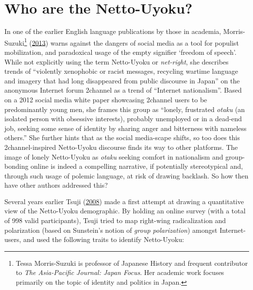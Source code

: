 \documentclass[10pt,british,A4paper,oneside]{memoir}
\begin{document}
\section{Who are the Netto-Uyoku?}\label{who-are-the-netto-uyoku}

In one of the earlier English language publications by those in
academia, Morris-Suzuki\footnote{Tessa Morris-Suzuki is professor of
  Japanese History and frequent contributor to \emph{The Asia-Pacific
  Journal: Japan Focus}. Her academic work focuses primarily on the
  topic of identity and politics in Japan.}
(\protect\hyperlink{ref-morris-suzuki_freedom_2013}{2013}) warns against
the dangers of social media as a tool for populist mobilization, and
paradoxical usage of the empty signifier `freedom of speech'. While not
explicitly using the term Netto-Uyoku or \emph{net-right}, she describes
trends of ``violently xenophobic or racist messages, recycling wartime
language and imagery that had long disappeared from public discourse in
Japan'' on the anonymous Internet forum 2channel as a trend of
``Internet nationalism''. Based on a 2012 social media white paper
showcasing 2channel users to be predominantly young men, she frames this
group as ``lonely, frustrated \emph{otaku} (an isolated person with
obsessive interests), probably unemployed or in a dead-end job, seeking
some sense of identity by sharing anger and bitterness with nameless
others.'' She further hints that as the social media-scape shifts, so
too does this 2channel-inspired Netto-Uyoku discourse finds its way to
other platforms. The image of lonely Netto-Uyoku as \emph{otaku} seeking
comfort in nationalism and group-bonding online is indeed a compelling
narrative, if potentially stereotypical and, through such usage of
polemic language, at risk of drawing backlash. So how then have other
authors addressed this?

Several years earlier Tsuji
(\protect\hyperlink{ref-tsuji_eng:_2008}{2008}) made a first attempt at
drawing a quantitative view of the Netto-Uyoku demographic. By holding
an online survey (with a total of 998 valid participants), Tsuji tried
to map right-wing radicalization and polarization (based on Sunstein's
notion of \emph{group polarization}) amongst Internet-users, and used
the following traits to identify Netto-Uyoku:
\end{document}
